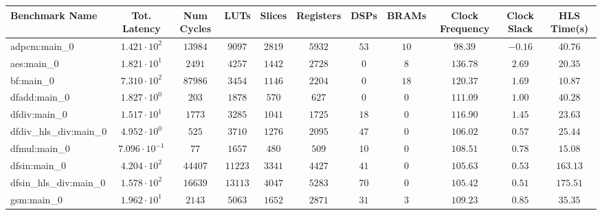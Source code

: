 \begin{tabular}{|l|c|c|c|c|c|c|c|c|c|c|}
\hline
Benchmark Name          & Tot. Latency            & Num Cycles & LUTs      & Slices    & Registers & DSPs    & BRAMs   & Clock Frequency & Clock Slack & HLS Time(s) \\
\hline
adpcm:main\_0           & $ 1.421 \cdot 10^{2}  $ & $ 13984  $ & $ 9097  $ & $ 2819  $ & $ 5932  $ & $ 53  $ & $ 10  $ & $ 98.39       $ & $ -0.16   $ & $ 40.76   $ \\
aes:main\_0             & $ 1.821 \cdot 10^{1}  $ & $ 2491   $ & $ 4257  $ & $ 1442  $ & $ 2728  $ & $ 0   $ & $ 8   $ & $ 136.78      $ & $ 2.69    $ & $ 20.35   $ \\
bf:main\_0              & $ 7.310 \cdot 10^{2}  $ & $ 87986  $ & $ 3454  $ & $ 1146  $ & $ 2204  $ & $ 0   $ & $ 18  $ & $ 120.37      $ & $ 1.69    $ & $ 10.87   $ \\
dfadd:main\_0           & $ 1.827 \cdot 10^{0}  $ & $ 203    $ & $ 1878  $ & $ 570   $ & $ 627   $ & $ 0   $ & $ 0   $ & $ 111.09      $ & $ 1.00    $ & $ 40.28   $ \\
dfdiv:main\_0           & $ 1.517 \cdot 10^{1}  $ & $ 1773   $ & $ 3285  $ & $ 1041  $ & $ 1725  $ & $ 18  $ & $ 0   $ & $ 116.90      $ & $ 1.45    $ & $ 23.63   $ \\
dfdiv\_hls\_div:main\_0 & $ 4.952 \cdot 10^{0}  $ & $ 525    $ & $ 3710  $ & $ 1276  $ & $ 2095  $ & $ 47  $ & $ 0   $ & $ 106.02      $ & $ 0.57    $ & $ 25.44   $ \\
dfmul:main\_0           & $ 7.096 \cdot 10^{-1} $ & $ 77     $ & $ 1657  $ & $ 480   $ & $ 509   $ & $ 10  $ & $ 0   $ & $ 108.51      $ & $ 0.78    $ & $ 15.08   $ \\
dfsin:main\_0           & $ 4.204 \cdot 10^{2}  $ & $ 44407  $ & $ 11223 $ & $ 3341  $ & $ 4427  $ & $ 41  $ & $ 0   $ & $ 105.63      $ & $ 0.53    $ & $ 163.13  $ \\
dfsin\_hls\_div:main\_0 & $ 1.578 \cdot 10^{2}  $ & $ 16639  $ & $ 13113 $ & $ 4047  $ & $ 5283  $ & $ 70  $ & $ 0   $ & $ 105.42      $ & $ 0.51    $ & $ 175.51  $ \\
gsm:main\_0             & $ 1.962 \cdot 10^{1}  $ & $ 2143   $ & $ 5063  $ & $ 1652  $ & $ 2871  $ & $ 31  $ & $ 3   $ & $ 109.23      $ & $ 0.85    $ & $ 35.35   $ \\

\end{tabular}
